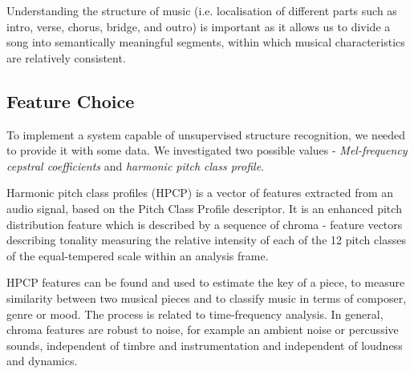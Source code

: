 Understanding the structure of music (i.e. localisation of different parts such as intro, verse, chorus, bridge, and outro) is important as it allows us to divide a song into semantically meaningful segments, within which musical characteristics are relatively consistent.

\vspace{10pt}

\subsection{Feature Choice}

To implement a system capable of unsupervised structure recognition, we needed to provide it with some data. We investigated two possible values - \textit{Mel-frequency cepstral coefficients} and \textit{harmonic pitch class profile}.

Harmonic pitch class profiles (HPCP) is a vector of features extracted from an audio signal, based on the Pitch Class Profile descriptor. It is an enhanced pitch distribution feature which is described by a sequence of chroma - feature vectors describing tonality measuring the relative intensity of each of the 12 pitch classes of the equal-tempered scale within an analysis frame. 

HPCP features can be found and used to estimate the key of a piece, to measure similarity between two musical pieces and to classify music in terms of composer, genre or mood. The process is related to time-frequency analysis. In general, chroma features are robust to noise, for example an ambient noise or percussive sounds, independent of timbre and instrumentation and independent of loudness and dynamics.


